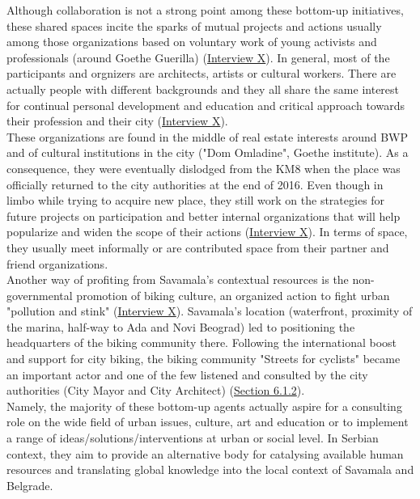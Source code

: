 \documentclass[11pt]{report}
\begin{document}
Although collaboration is not a strong point among these bottom-up initiatives, these shared spaces incite the sparks of mutual projects and actions usually among those organizations based on voluntary work of young activists and professionals (around Goethe Guerilla) (\href{InterviewX}{Interview X}).
In general, most of the participants and orgnizers are architects, artists or cultural workers.
There are actually people with different backgrounds and they all share the same interest for continual personal development and education and critical approach towards their profession and their city (\href{InterviewX}{Interview X}).
\\

These organizations are found in the middle of real estate interests around BWP and  of cultural institutions in the city ("Dom Omladine", Goethe institute).
As a consequence, they were eventually dislodged from the KM8 when the place was officially returned to the city authorities at the end of 2016.
Even though in limbo while trying to acquire new place, they still work on the strategies for future projects on participation and better internal organizations that will help popularize and widen the scope of their actions (\href{InterviewX}{Interview X}).
In terms of space, they usually meet informally or are contributed space from their partner and friend organizations.
\\

Another way of profiting from Savamala's contextual resources is the non-governmental promotion of biking culture, an organized action to fight urban "pollution and stink"
(\href{InterviewX}{Interview X}).
Savamala's location (waterfront, proximity of the marina, half-way to Ada and Novi Beograd) led to positioning the headquarters of the biking community there. 
Following the international boost and support for city biking, the biking community "Streets for cyclists" became an important actor and one of the few listened and consulted by the city authorities (City Mayor and City Architect) (\href{Section 6.1.2}{Section 6.1.2}).
\\

Namely, the majority of these bottom-up agents actually aspire for a consulting role on the wide field of urban issues, culture, art and education or to implement a range of ideas/solutions/interventions at urban or social level. In Serbian context, they aim to provide an alternative body for catalysing available human resources and translating global knowledge into the local context of Savamala and Belgrade.
\end{document}
